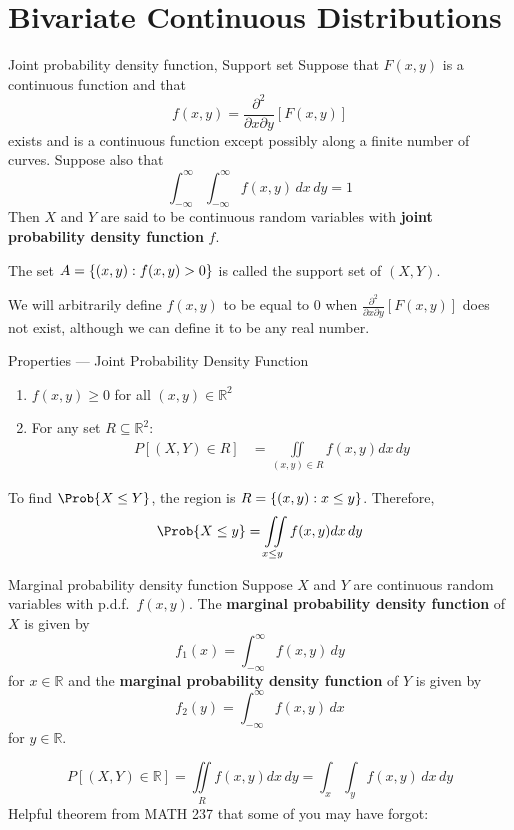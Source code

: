 \section{Bivariate Continuous Distributions}
\begin{Definition}{Joint probability density function, Support set}{}
    Suppose that $ F(x,y) $ is a continuous
    function and that
    \[ f(x,y)=\frac{\partial^2}{\partial x\partial y}\left[ F(x,y) \right]  \]
    exists and is a continuous function
    except possibly along a finite number of curves.
    Suppose also that
    \[ \int_{-\infty}^{\infty} \int_{-\infty}^{\infty} f(x,y)\, d{x}\, d{y}=1  \]
    Then $ X $ and $ Y $ are said to be continuous random
    variables with \textbf{joint probability density function} $ f $.

    The set $ A=\{(x,y):f(x,y)>0\} $ is called the support set of $ (X,Y) $.
\end{Definition}
\begin{Remark}{}{}
    We will arbitrarily define $ f(x,y) $ to be equal to $ 0 $ when
    $ \displaystyle  \frac{\partial^2}{\partial x\partial y}\left[ F(x,y) \right]
    $
    does not exist, although we can define it to be any real number.
\end{Remark}
\begin{Definition}{Properties --- Joint Probability Density Function}{}
    \begin{enumerate}[label=(\Roman*)]
        \item $ f(x,y)\ge 0 $ for all $ (x,y)\in\mathbb{R}^2 $
        \item For any set $ R\subseteq \mathbb{R}^2 $:
              \begin{align*}
                  P\left[ (X,Y)\in R \right]
                   & =\iint\limits_{(x,y)\in R}f(x,y)dx\,dy
              \end{align*}
    \end{enumerate}
\end{Definition}
\begin{Example}{}{}
    To find $ \Prob{X\le Y} $, the region is
    $ R=\{(x,y):x\le y\} $. Therefore,
    \[ \Prob{X\le y}=
        \iint\limits_{x\le y}f(x,y)dx\,dy \]
\end{Example}
\begin{Definition}{Marginal probability density function}{}
    Suppose $ X $ and $ Y $ are continuous random variables with
    p.d.f.\ $ f(x,y) $. The \textbf{marginal probability
        density function} of $ X $ is given by
    \[ f_1(x)=\int_{-\infty}^{\infty} f(x,y)\, d{y} \]
    for $ x\in\mathbb{R} $ and the \textbf{marginal probability
        density function} of $ Y $ is given by
    \[ f_2(y)=\int_{-\infty}^{\infty} f(x,y)\, d{x}  \]
    for $ y\in\mathbb{R} $.
\end{Definition}
\[ P\left[ (X,Y)\in\mathbb{R} \right]
    =\iint\limits_{R}f(x,y)dx\,dy=
    \int_{x} \int_{y}f(x,y) \, d{x} \, d{y} \]
Helpful theorem from MATH 237 that some of you may have forgot:

